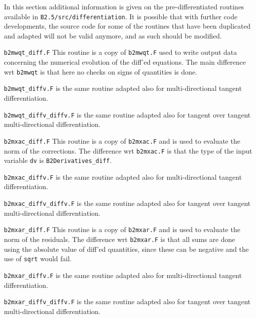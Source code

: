 In this section additional information is given on the pre-differentiated routines available in {\tt B2.5/src/differentiation}. It is possible that with further code developments, the source code for some of the routines that have been duplicated and adapted will not be valid anymore, and as such should be modified.
\begin{description}
  \item{\tt b2mwqt\_diff.F} This routine is a copy of {\tt b2mwqt.F} used to write output data concerning the numerical evolution of the diff'ed equations. The main difference wrt {\tt b2mwqt} is that here no checks on signs of quantities is done. 

  \item{\tt b2mwqt\_diffv.F} is the same routine adapted also for multi-directional tangent differentiation.

  \item{\tt b2mwqt\_diffv\_diffv.F} is the same routine adapted also for tangent over tangent multi-directional  differentiation.

  \item{\tt b2mxac\_diff.F} This routine is a copy of {\tt b2mxac.F} and is used to evaluate the norm of the corrections. The difference wrt {\tt b2mxac.F} is that the type of the input variable {\tt dv} is {\tt B2Derivatives\_diff}. 

  \item{\tt b2mxac\_diffv.F} is the same routine adapted also for multi-directional tangent differentiation. 

  \item{\tt b2mxac\_diffv\_diffv.F} is the same routine adapted also for tangent over tangent multi-directional  differentiation.

  \item{\tt b2mxar\_diff.F} This routine is a copy of {\tt b2mxar.F} and is used to evaluate the norm of the residuals. The difference wrt {\tt b2mxar.F} is that all sums are done using the absolute value of diff'ed quantities, since these can be negative and the use of {\tt sqrt} would fail. 

  \item{\tt b2mxar\_diffv.F} is the same routine adapted also for multi-directional tangent differentiation.

  \item{\tt b2mxar\_diffv\_diffv.F} is the same routine adapted also for tangent over tangent multi-directional  differentiation.


\end{description}
